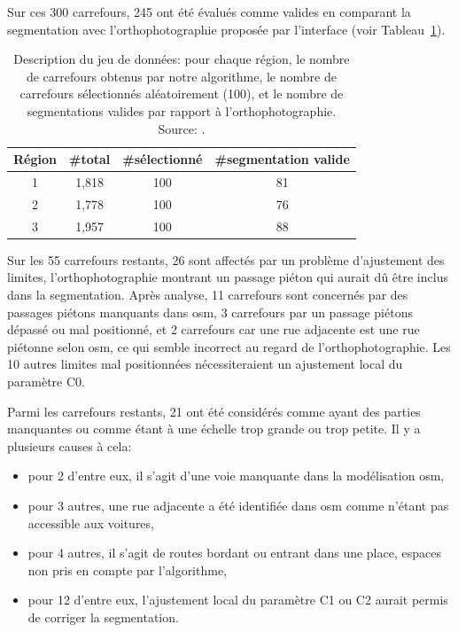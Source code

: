\newpar{}

Sur ces 300 carrefours, 245 ont été évalués comme valides en comparant la segmentation avec l'orthophotographie proposée par l'interface (voir Tableau~\ref{tab:nbRegions}).

\newpar{}

\begin{table}[ht]    
    \centering
    \footnotesize
    \begin{tabular}{c|c|c|c}
         Région & \#total & \#sélectionné & \#segmentation valide \\
         \hline
         1 & 1,818 & 100 & 81 \\
         2 & 1,778 & 100 & 76 \\
         3 & 1,957 & 100 & 88 \\
    \end{tabular}
    \caption[Description du jeu de données d'évaluation]{Description du jeu de données: pour chaque région, le nombre de carrefours obtenus par notre algorithme, le nombre de carrefours sélectionnés aléatoirement (100), et le nombre de segmentations valides par rapport à l'orthophotographie. Source: \citep{Favreau2022}.}
    \label{tab:nbRegions}
\end{table}


Sur les 55 carrefours restants, 26 sont affectés par un problème d'ajustement des limites, l'orthophotographie montrant un passage piéton qui aurait dû être inclus dans la segmentation.
Après analyse, 11 carrefours sont concernés par des passages piétons manquants dans \gls{osm}, 3 carrefours par un passage piétons dépassé ou mal positionné, et 2 carrefours car une rue adjacente est une rue piétonne selon \gls{osm}, ce qui semble incorrect au regard de l'orthophotographie. Les 10 autres limites mal positionnées nécessiteraient un ajustement local du paramètre C0.

\newpar{}

Parmi les carrefours restants, 21 ont été considérés comme ayant des parties manquantes ou comme étant à une échelle trop grande ou trop petite. Il y a plusieurs causes à cela: 
\begin{itemize}
    \item pour 2 d'entre eux, il s'agit d'une voie manquante dans la modélisation \gls{osm}, 
    \item pour 3 autres, une rue adjacente a été identifiée dans \gls{osm} comme n'étant pas accessible aux voitures, 
    \item pour 4 autres, il s'agit de routes bordant ou entrant dans une place, espaces non pris en compte par l'algorithme,
    \item pour 12 d'entre eux, l'ajustement local du paramètre C1 ou C2 aurait permis de corriger la segmentation.
\end{itemize}


